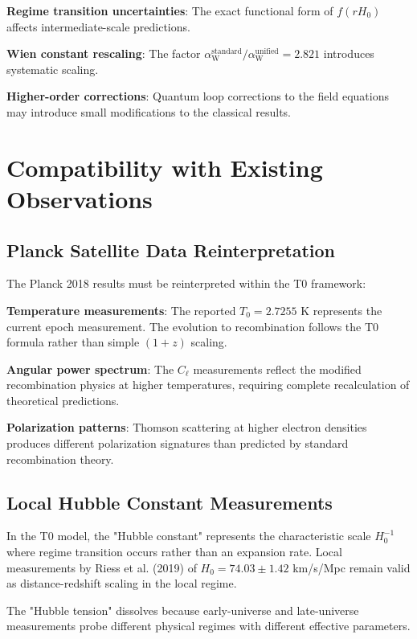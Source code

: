 \documentclass[12pt,a4paper]{article}
\newcommand{\alphaW}{\alpha_{\text{W}}}
\begin{document}
	\textbf{Regime transition uncertainties}: The exact functional form of $f(rH_0)$ affects intermediate-scale predictions.
	
	\textbf{Wien constant rescaling}: The factor $\alphaW^{\text{standard}}/\alphaW^{\text{unified}} = 2.821$ introduces systematic scaling.
	
	\textbf{Higher-order corrections}: Quantum loop corrections to the field equations may introduce small modifications to the classical results.
	
	\section{Compatibility with Existing Observations}
	\label{sec:existing_observations}
	
	\subsection{Planck Satellite Data Reinterpretation}
	\label{subsec:planck_reinterpretation}
	
	The Planck 2018 results must be reinterpreted within the T0 framework:
	
	\textbf{Temperature measurements}: The reported $T_0 = 2.7255$ K represents the current epoch measurement. The evolution to recombination follows the T0 formula rather than simple $(1+z)$ scaling.
	
	\textbf{Angular power spectrum}: The $C_\ell$ measurements reflect the modified recombination physics at higher temperatures, requiring complete recalculation of theoretical predictions.
	
	\textbf{Polarization patterns}: Thomson scattering at higher electron densities produces different polarization signatures than predicted by standard recombination theory.
	
	\subsection{Local Hubble Constant Measurements}
	\label{subsec:local_hubble}
	
	In the T0 model, the "Hubble constant" represents the characteristic scale $H_0^{-1}$ where regime transition occurs rather than an expansion rate. Local measurements by Riess et al. (2019) of $H_0 = 74.03 \pm 1.42$ km/s/Mpc remain valid as distance-redshift scaling in the local regime.
	
	The "Hubble tension" dissolves because early-universe and late-universe measurements probe different physical regimes with different effective parameters.
	
\end{document}
